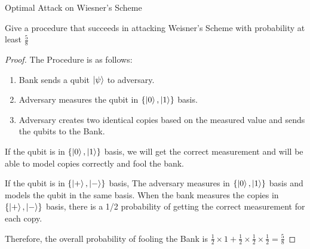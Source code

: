 \begin{solution}{Optimal Attack on Wiesner’s Scheme}\label{ques:x}
    \begin{question}
    Give a procedure that succeeds in attacking Weisner's Scheme with probability at least $\frac{5}{8}$ 
    \end{question}
    \tcblower{}
    \begin{proof}
    The Procedure is as follows:

    \begin{enumerate}
        \item Bank sends a qubit $\ket{\psi}$ to adversary.
        \item Adversary measures the qubit in $\{\ket{0},\ket{1}\}$ basis.
        \item Adversary creates two identical copies based on the measured value and sends the qubits to the Bank.
    \end{enumerate}

    If the qubit is in $\{\ket{0},\ket{1}\}$ basis, we will get the correct measurement and will be able to model copies correctly and fool the bank.

    If the qubit is in $\{\ket{+},\ket{-}\}$ basis, The adversary measures in $\{\ket{0},\ket{1}\}$ basis and models the qubit in the same basis. When the bank measures the copies in $\{\ket{+},\ket{-}\}$ basis, there is a 1/2 probability of getting the correct measurement for each copy.

    Therefore, the overall probability of fooling the Bank is $\frac{1}{2} \times 1 + \frac{1}{2} \times \frac{1}{2} \times \frac{1}{2} = \frac{5}{8}$
    
    \end{proof}
\end{solution}
 